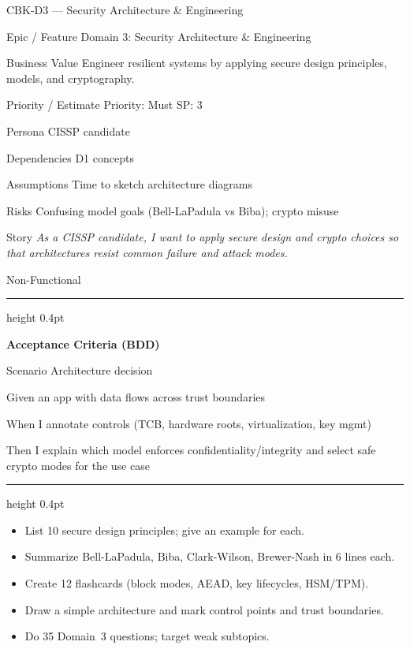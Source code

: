 \documentclass[11pt,a4paper]{article}
\providecommand{\square}{\fbox{\rule{0pt}{0.85ex}\rule{0.85ex}{0pt}}}%
\newcommand{\citem}{\item[$\square$]}
\newcommand{\Tag}[1]{\tcbox[on line, colback=PillBack, colframe=PillBack,
  coltext=PillText, boxrule=0pt, arc=2mm, left=2pt, right=2pt, top=1pt, bottom=1pt]{\small #1}}
\newcommand{\ThinRule}{\par\vspace{4pt}\hrule height 0.4pt\par\vspace{4pt}}
\begin{document}
\clearpage
\begin{StoryCardBox}{CBK-D3 --- Security Architecture \& Engineering}
\begin{metadesc}
\item[Epic / Feature] Domain 3: Security Architecture \& Engineering
\item[Business Value] Engineer resilient systems by applying secure design principles, models, and cryptography.
\item[Priority / Estimate] Priority: Must \quad SP: 3
\item[Persona] CISSP candidate
\item[Dependencies] D1 concepts
\item[Assumptions] Time to sketch architecture diagrams
\item[Risks] Confusing model goals (Bell-LaPadula vs Biba); crypto misuse
\item[Story] \textit{As a CISSP candidate, I want to apply secure design and crypto choices so that architectures resist common failure and attack modes.}
\item[Non-Functional] \Tag{Security} \Tag{Reliability}
\end{metadesc}

\ThinRule
\textbf{Acceptance Criteria (BDD)}
\begin{metadesc}
\item[Scenario] Architecture decision
\item[Given] an app with data flows across trust boundaries
\item[When] I annotate controls (TCB, hardware roots, virtualization, key mgmt)
\item[Then] I explain which model enforces confidentiality/integrity and select safe crypto modes for the use case
\end{metadesc}

\ThinRule
\begin{TasksBox}
\begin{itemize}
  \citem List 10 secure design principles; give an example for each.
  \citem Summarize Bell-LaPadula, Biba, Clark-Wilson, Brewer-Nash in 6 lines each.
  \citem Create 12 flashcards (block modes, AEAD, key lifecycles, HSM/TPM).
  \citem Draw a simple architecture and mark control points and trust boundaries.
  \citem Do 35 Domain~3 questions; target weak subtopics.
\end{itemize}
\end{TasksBox}
\end{StoryCardBox}
\end{document}
